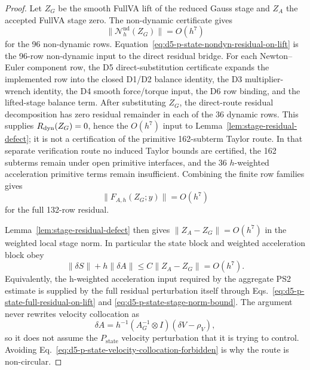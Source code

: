 \documentclass[preprint,12pt]{elsarticle}
\begin{document}
\begin{proof}
Let \(Z_G\) be the smooth FullVA lift of the reduced Gauss stage and
\(Z_A\) the accepted FullVA stage zero.  The non-dynamic certificate gives
\begin{equation}
\label{eq:d5-p-state-nondyn-residual-on-lift}
  \|\mathcal N_h^{\mathrm{nd}}(Z_G)\|=O(h^7)
\end{equation}
for the 96 non-dynamic rows.  Equation~\eqref{eq:d5-p-state-nondyn-residual-on-lift}
is the 96-row non-dynamic input to the direct residual bridge.
For each Newton--Euler component row, the D5
direct-substitution certificate expands the implemented row into the closed
D1/D2 balance identity, the D3 multiplier-wrench identity, the D4 smooth
force/torque input, the D6 row binding, and the lifted-stage balance term.
After substituting \(Z_G\), the direct-route residual decomposition has zero
residual remainder in each of the 36 dynamic rows. This supplies
\(R_{\rm dyn}(Z_G)=0\), hence the \(O(h^7)\) input to
Lemma~\ref{lem:stage-residual-defect}; it is not a certification of the
primitive 162-subterm Taylor route. In that separate verification route no
induced Taylor bounds are certified, the 162 subterms remain under open
primitive interfaces, and the 36 \(h\)-weighted acceleration primitive terms
remain insufficient.
Combining the finite row families gives
\begin{equation}
\label{eq:d5-p-state-full-residual-on-lift}
  \|F_{A,h}(Z_G;y)\|=O(h^7)
\end{equation}
for the full 132-row residual.

Lemma~\ref{lem:stage-residual-defect} then gives
\(\|Z_A-Z_G\|=O(h^7)\) in the weighted local stage norm.  In particular the
state block and weighted acceleration block obey
\begin{equation}
\label{eq:d5-p-state-stage-norm-bound}
  \|\delta S\| + h\|\delta A\| \le C\|Z_A-Z_G\|=O(h^7).
\end{equation}
Equivalently, the h-weighted acceleration input required by the aggregate
PS2 estimate is supplied by the full residual perturbation itself through
Eqs.~\eqref{eq:d5-p-state-full-residual-on-lift} and
\eqref{eq:d5-p-state-stage-norm-bound}.  The
argument never rewrites velocity collocation as
\begin{equation}
\label{eq:d5-p-state-velocity-collocation-forbidden}
  \delta A=h^{-1}(A_G^{-1}\otimes I)(\delta V-\rho_V),
\end{equation}
so it does not assume the \(P_{\mathrm{state}}\) velocity perturbation that it
is trying to control.  Avoiding Eq.~\eqref{eq:d5-p-state-velocity-collocation-forbidden}
is why the route is non-circular.


\end{proof}
\end{document}
